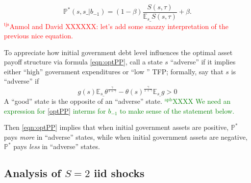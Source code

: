 \documentclass[12pt]{article}
\newcommand{\apb}[1]{\textcolor{green}{$^{\textrm{apb}}${#1}}}
\newcommand{\tjs}[1]{\textcolor{red}{$^{\textrm{tjs}}${#1}}}
\newcommand{\EE}{\mathbb E}
\begin{document}
\begin{equation}\label{eqn:optPP}
 \mathbb{P}^*(s, s\_ |b_{-1}) = (1-\beta)\frac{S(s,\tau)}{\EE_{s\_} S(s,\tau)} + \beta.
 \end{equation}
\tjs{Anmol and David XXXXXX: let's add some snazzy interpretation of the previous nice equation.}



To appreciate how  initial government debt level influences the optimal asset payoff structure via formula \eqref{eqn:optPP}, call a
 state $s$ ``adverse''  if it implies either ``high'' government expenditures or ``low '' TFP; formally, say that  $s$ is ``adverse'' if
\[   g(s)\EE_{s\_}\theta^\frac{\gamma}{1+\gamma}-\theta(s)^\frac\gamma{1+\gamma}\EE_{s\_} g >0\]
A ``good'' state is the opposite of an ``adverse'' state.
\apb{XXXX We need an expression for \eqref{optPP} interms for $b_{-1}$ to make sense of the statement below. }

Then \eqref{eqn:optPP} implies that
 when initial government assets are positive, $\mathbb{P}^*$   pays {\em more} in ``adverse'' states, while when initial government assets are
 negative, $\mathbb{P}^*$  pays {\em less} in ``adverse'' states.  

%
%		
%	
%			

\subsection{Analysis of $S=2$ iid shocks} %
\end{document}
